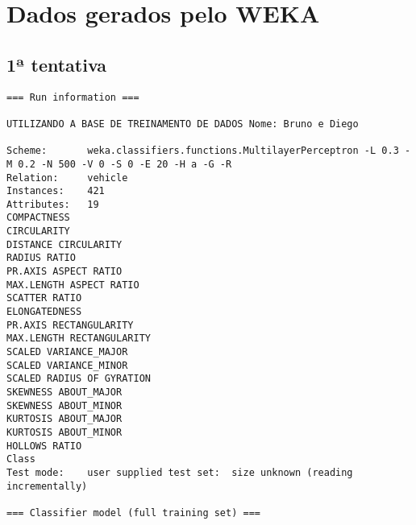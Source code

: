 \documentclass[
	article,			%
	11pt,				%
	oneside,			%
	a4paper,			%
	english,			%
	brazil,				%
	sumario=tradicional
	]{abntex2}
\begin{document}
\newpage 
\appendix
\chapter{Dados gerados pelo WEKA}

\textbf{}

\section{1ª tentativa}

\begin{lstlisting}
=== Run information ===

UTILIZANDO A BASE DE TREINAMENTO DE DADOS Nome: Bruno e Diego

Scheme:       weka.classifiers.functions.MultilayerPerceptron -L 0.3 -M 0.2 -N 500 -V 0 -S 0 -E 20 -H a -G -R
Relation:     vehicle
Instances:    421
Attributes:   19
COMPACTNESS
CIRCULARITY
DISTANCE CIRCULARITY
RADIUS RATIO
PR.AXIS ASPECT RATIO
MAX.LENGTH ASPECT RATIO
SCATTER RATIO
ELONGATEDNESS
PR.AXIS RECTANGULARITY
MAX.LENGTH RECTANGULARITY
SCALED VARIANCE_MAJOR
SCALED VARIANCE_MINOR
SCALED RADIUS OF GYRATION
SKEWNESS ABOUT_MAJOR
SKEWNESS ABOUT_MINOR
KURTOSIS ABOUT_MAJOR
KURTOSIS ABOUT_MINOR
HOLLOWS RATIO
Class
Test mode:    user supplied test set:  size unknown (reading incrementally)

=== Classifier model (full training set) ===


\end{lstlisting}
\end{document}
